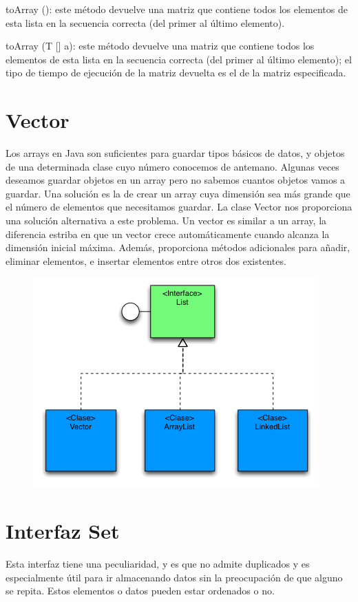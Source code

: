 \documentclass[12pt,a4paper]{report}
\begin{document}
{toArray (): este método devuelve una matriz que contiene todos los elementos de esta lista en la secuencia correcta (del primer al último elemento).

toArray (T [] a): este método devuelve una matriz que contiene todos los elementos de esta lista en la secuencia correcta (del primer al último elemento); el tipo de tiempo de ejecución de la matriz devuelta es el de la matriz especificada.

\section{Vector}
Los arrays en Java son suficientes para guardar tipos básicos de datos, y objetos de una determinada clase cuyo número conocemos de antemano. Algunas veces deseamos guardar objetos en un array pero no sabemos cuantos objetos vamos a guardar. Una solución es la de crear un array cuya dimensión sea más grande que el número de elementos que necesitamos guardar. La clase Vector nos proporciona una solución alternativa a este problema. Un vector es similar a un array, la diferencia estriba en que un vector crece automáticamente cuando alcanza la dimensión inicial máxima. Además, proporciona métodos adicionales para añadir, eliminar elementos, e insertar elementos entre otros dos existentes.

\begin{figure}[hbtp]
\centering
\includegraphics[scale=1]{interfazlist.PNG}
\end{figure}

\section*{Interfaz Set}
Esta interfaz tiene una peculiaridad, y es que no admite duplicados y es especialmente útil para ir almacenando datos sin la preocupación de que alguno se repita. Estos elementos o datos pueden estar ordenados o no.

}
\end{document}
